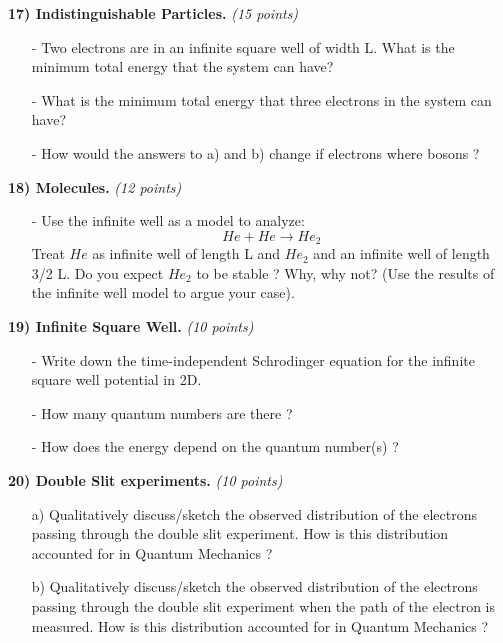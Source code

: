 {\clearpage

\textbf{17) Indistinguishable Particles. } \hfill \textit{(15 points)}
\begin{itemize}
\item[-]{ %
Two electrons are in an infinite square well of width L.
What is the minimum total energy that the system can have? 
}
\vspace*{2.5in}
\item[-]{ %
What is the minimum total energy that three electrons in the system can have? 
}
\vspace*{2.5in}
\item[-]{ %
How would the answers to a) and b) change if electrons where bosons ?
}
\end{itemize}

\clearpage

\begin{minipage}{\textwidth}
\textbf{18) Molecules. }\hfill \textit{(12 points)}
\begin{itemize}
\item[-] Use the infinite well as a model to analyze:  %
\begin{equation}
He + He \rightarrow He_2 
\end{equation}
Treat $He$ as infinite well of length L and $He_2$ and an infinite well of length 3/2 L.
Do you expect $He_2$ to be stable ? Why, why not? (Use the results of the infinite well model to argue your case).
\end{itemize}
\end{minipage}

\begin{minipage}{\textwidth}
\textbf{19) Infinite Square Well. }  \hfill \textit{(10 points)}
\begin{itemize}
\item[-] Write down the time-independent Schrodinger equation for the infinite square well potential in 2D. %
\vspace*{2.5in}
\item[-] How many quantum numbers are there ?  %
\vspace*{2.5in}
\item[-] How does the energy depend on the quantum number(s) ? %
\vspace*{2.5in}
\end{itemize}
\end{minipage}

\clearpage

\textbf{20) Double Slit experiments. }  \hfill \textit{(10 points)}
\begin{itemize}
\item[a)]
Qualitatively discuss/sketch the observed distribution of the electrons passing through the double slit experiment.
How is this distribution accounted for in Quantum Mechanics ?
\item[b)]\vspace{3in}
Qualitatively discuss/sketch the observed distribution of the electrons passing through the double slit experiment when the path of the electron is measured.
How is this distribution accounted for in Quantum Mechanics ?
\end{itemize}



} %

